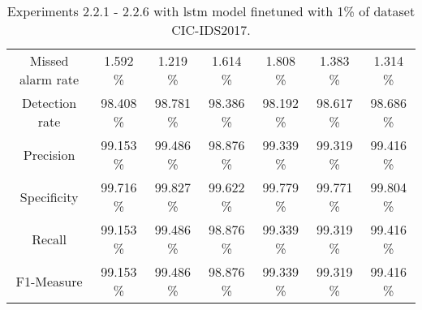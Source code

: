 \begin{table}[htb]
\begin{tabular}{@{}ccccccc@{}}
        Missed alarm rate &  1.592 \% &  1.219 \% &  1.614 \% &  1.808 \% &  1.383 \% &  1.314 \% \\
        Detection rate &  98.408 \% &  98.781 \% &  98.386 \% &  98.192 \% &  98.617 \% &  98.686 \% \\
        Precision &  99.153 \% &  99.486 \% &  98.876 \% &  99.339 \% &  99.319 \% &  99.416 \% \\
        Specificity &  99.716 \% &  99.827 \% &  99.622 \% &  99.779 \% &  99.771 \% &  99.804 \% \\
        Recall &  99.153 \% &  99.486 \% &  98.876 \% &  99.339 \% &  99.319 \% &  99.416 \% \\
        F1-Measure &  99.153 \% &  99.486 \% &  98.876 \% &  99.339 \% &  99.319 \% &  99.416 \% \\
        \bottomrule
    \end{tabular}
    \caption{Experiments 2.2.1 - 2.2.6 with \gls{lstm} model finetuned with 1\% of dataset CIC-IDS2017.}
    \label{table:results:lstm:flows_1}
\end{table}